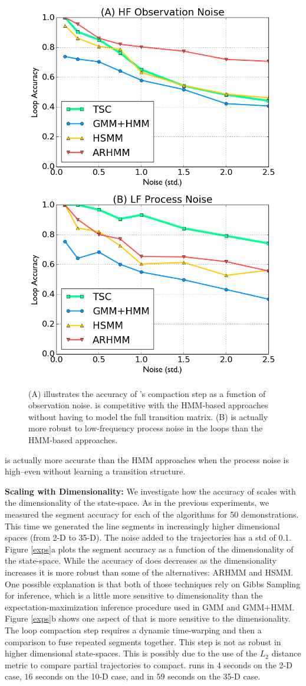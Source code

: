 \begin{figure}[ht!]
\centering
\includegraphics[width=0.48\columnwidth]{tsc-experiments/exp6.png}
\includegraphics[width=0.48\columnwidth]{tsc-experiments/exp7.png}
\caption{(A) illustrates the accuracy of \tsc's compaction step as a function of observation noise. \tsc is competitive with the HMM-based approaches without having to model the full transition matrix. (B) \tsc is actually more robust to low-frequency process noise in the loops than the HMM-based approaches. \label{exp4}}
\end{figure}
\tsc is actually more accurate than the HMM approaches when the process noise is high--even without learning a transition structure.

\textbf{Scaling with Dimensionality: }
We investigate how the accuracy of \tsc scales with the dimensionality of the state-space.
As in the previous experiments, we measured the segment accuracy for each of the algorithms for 50 demonstrations.
This time we generated the line segments in increasingly higher dimensional spaces (from 2-D to 35-D).
The noise added to the trajectories has a std of 0.1.
Figure \ref{exps}a plots the segment accuracy as a function of the dimensionality of the state-space.
While the accuracy of \tsc does decreases as the dimensionality increases it is more robust than some of the alternatives: ARHMM and HSMM.
One possible explanation is that both of those techniques rely on Gibbs Sampling for inference, which is a little more sensitive to dimensionality than the expectation-maximization inference procedure used in GMM and GMM+HMM.
Figure \ref{exps}b shows one aspect of \tsc that is more sensitive to the dimensionality.
The loop compaction step requires a dynamic time-warping and then a comparison to fuse repeated segments together.
This step is not as robust in higher dimensional state-spaces.
This is possibly due to the use of the $L_2$ distance metric to compare partial trajectories to compact.
\tsc runs in $4$ seconds on the 2-D case, $16$ seconds on the 10-D case, and in $59$ seconds on the 35-D case. 


